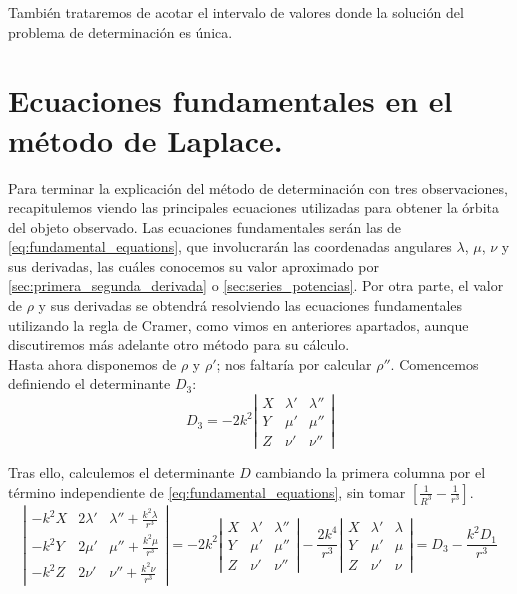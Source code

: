 \documentclass[11pt]{book}
\begin{document}
También trataremos de acotar el intervalo de valores donde la solución del problema de determinación es única.\\

\section{Ecuaciones fundamentales en el método de Laplace.}
\label{sec:fundamental_equations}
Para terminar la explicación del método de determinación con tres observaciones, recapitulemos viendo las principales ecuaciones utilizadas para obtener la órbita del objeto observado. Las ecuaciones fundamentales serán las de \eqref{eq:fundamental_equations}, que involucrarán las coordenadas angulares $\lambda$, $\mu$, $\nu$ y sus derivadas, las cuáles conocemos su valor aproximado por \ref{sec:primera_segunda_derivada} o \ref{sec:series_potencias}. Por otra parte, el valor de $\rho$ y sus derivadas se obtendrá resolviendo las ecuaciones fundamentales utilizando la regla de Cramer, como vimos en anteriores apartados, aunque discutiremos más adelante otro método para su cálculo.\\

Hasta ahora disponemos de $\rho$ y $\rho'$; nos faltaría por calcular $\rho''$. Comencemos definiendo el determinante $D_3$:
\[
D_3=-2k^2
\left|
\begin{array}{ccc}
X & \lambda' & \lambda''\\
Y & \mu' & \mu''\\
Z & \nu' & \nu''
\end{array}
\right|
\]

Tras ello, calculemos el determinante $D$ cambiando la primera columna por el término independiente de \eqref{eq:fundamental_equations}, sin tomar $[\frac{1}{R^3}-\frac{1}{r^3}]$. 
\[
\left|
\begin{array}{ccc}
-k^2X & 2\lambda' & \lambda''+\frac{k^2\lambda}{r^3}\\
-k^2Y & 2\mu' & \mu''+\frac{k^2\mu}{r^3}\\
-k^2Z & 2\nu' & \nu''+\frac{k^2\nu}{r^3}
\end{array}
\right|
=-2k^2
\left|
\begin{array}{ccc}
X & \lambda' & \lambda''\\
Y & \mu' & \mu''\\
Z & \nu' & \nu''
\end{array}
\right|
-\frac{2k^4}{r^3}
\left|
\begin{array}{ccc}
X & \lambda' & \lambda\\
Y & \mu' & \mu\\
Z & \nu' & \nu
\end{array}
\right|
=
D_3-\frac{k^2D_1}{r^3}
\]
\end{document}
